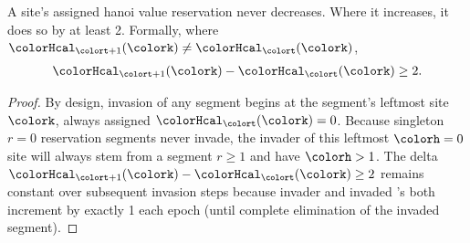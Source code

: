 \begin{lemma}
\label{thm:tilted-invader-minus-invaded}
A site's assigned hanoi value reservation never decreases.
Where it increases, it does so by at least 2.
Formally, where $\colorHcal_{\colort + 1}(\colork) \neq \colorHcal_{\colort}(\colork)$,
\begin{align*}
\colorHcal_{\colort + 1}(\colork) - \colorHcal_{\colort}(\colork) \geq 2.
\end{align*}
\end{lemma}

\begin{proof}
By design, invasion of any segment begins at the segment's leftmost site $\colork$, always assigned $\colorHcal_{\colort}(\colork) = 0$.
Because singleton $r=0$ reservation segments never invade, the invader of this leftmost $\colorh = 0$ site will always stem from a segment $r \geq 1$ and have \hv{} $\colorh > 1$.
The delta $\colorHcal_{\colort + 1}(\colork) - \colorHcal_{\colort}(\colork) \geq 2$ remains constant over subsequent invasion steps because invader and invaded \hv{}'s both increment by exactly 1 each epoch (until complete elimination of the invaded segment).
\end{proof}
